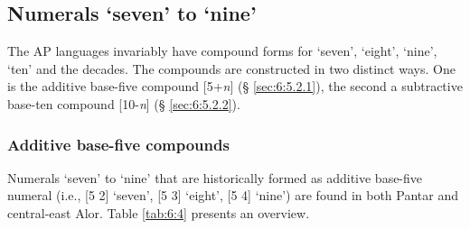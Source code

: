 \subsection{Numerals `seven' to `nine'}
The AP languages invariably have compound forms for `seven', `eight', `nine', `ten' and the decades. The compounds are constructed in two distinct ways. One is the additive base-five compound [5+\textit{n}] ({\S} \ref{sec:6:5.2.1}), the second a subtractive base-ten compound [10-\textit{n}] ({\S} \ref{sec:6:5.2.2}). 

\subsubsection{Additive base-five compounds} 
Numerals `seven' to `nine' that are historically formed as additive base-five numeral (i.e., [5 2] `seven', [5 3] `eight', [5 4] `nine') are found in both Pantar and central-east Alor. Table \ref{tab:6:4} presents an overview.

 

